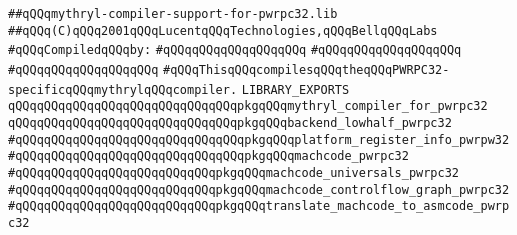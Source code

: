 \label{src/lib/compiler/mythryl-compiler-support-for-pwrpc32.lib}
\verb|##qQQqmythryl-compiler-support-for-pwrpc32.lib|\newline
\verb|##qQQq(C)qQQq2001qQQqLucentqQQqTechnologies,qQQqBellqQQqLabs|\newline
\newline
\verb|#qQQqCompiledqQQqby:|\newline
\verb|#qQQqqQQqqQQqqQQqqQQq|\newline
\verb|#qQQqqQQqqQQqqQQqqQQq|\newline
\verb|#qQQqqQQqqQQqqQQqqQQq|\newline
\newline
\verb|#qQQqThisqQQqcompilesqQQqtheqQQqPWRPC32-specificqQQqmythrylqQQqcompiler.|\newline
\newline
\newline
\newline
\verb|LIBRARY_EXPORTS|\newline
\newline
\verb|qQQqqQQqqQQqqQQqqQQqqQQqqQQqqQQqpkgqQQqmythryl_compiler_for_pwrpc32|\newline
\newline
\verb|qQQqqQQqqQQqqQQqqQQqqQQqqQQqqQQqpkgqQQqbackend_lowhalf_pwrpc32|\newline
\verb|#qQQqqQQqqQQqqQQqqQQqqQQqqQQqqQQqpkgqQQqplatform_register_info_pwrpw32|\newline
\verb|#qQQqqQQqqQQqqQQqqQQqqQQqqQQqqQQqpkgqQQqmachcode_pwrpc32|\newline
\verb|#qQQqqQQqqQQqqQQqqQQqqQQqqQQqpkgqQQqmachcode_universals_pwrpc32|\newline
\verb|#qQQqqQQqqQQqqQQqqQQqqQQqqQQqpkgqQQqmachcode_controlflow_graph_pwrpc32|\newline
\verb|#qQQqqQQqqQQqqQQqqQQqqQQqqQQqpkgqQQqtranslate_machcode_to_asmcode_pwrpc32|\newline
\newline
\newline
\newline
